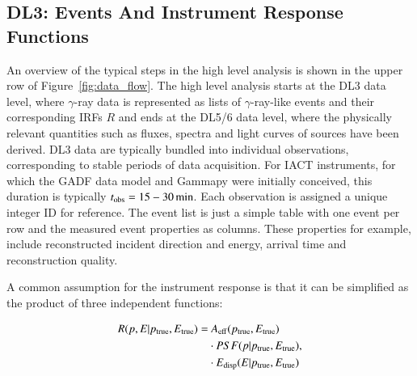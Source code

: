 \documentclass[longauth]{aa}
\newcommand{\gammapy}{Gammapy\xspace}
\newcommand{\gammaray}{$\gamma$-ray\xspace}
\newcommand{\gadf}{GADF\xspace}
\begin{document}
\subsection{DL3: Events And Instrument Response Functions}
An overview of the typical steps in the high level analysis is shown in the upper
row of Figure~\ref{fig:data_flow}. The high level analysis starts at the DL3 
data level, where \gammaray data is represented as lists of \gammaray-like events and their
corresponding IRFs $R$ and ends at the DL5/6 data level, where the physically relevant 
quantities such as fluxes, spectra and light curves of sources have been derived. DL3 data are typically 
bundled into individual observations, corresponding to
stable periods of data acquisition. For IACT instruments, for which the \gadf
data model and \gammapy were initially conceived, this duration is typically 
$t_{\rm obs}=15 - 30\,{\rm min}$. Each observation is assigned a unique integer ID for reference.
The event list is just a simple table with one event per row and
the measured event properties as columns. These properties for example, include reconstructed
incident direction and energy, arrival time and reconstruction quality.

A common assumption for the instrument response is that it can be simplified as the product 
of three independent functions:

\begin{equation}
        \begin{split}
   R(p, E|p_{\rm true}, E_{\rm true}) = &~A_{\rm eff}(p_{\rm true}, E_{\rm true}) \\
        & \cdot PSF(p|p_{\rm true}, E_{\rm true})\\
    & \cdot E_{\rm disp}(E|p_{\rm true}, E_{\rm true})
        \end{split}
,\end{equation}
\end{document}
